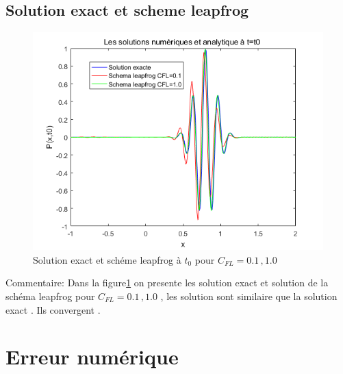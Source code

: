 \documentclass[a4paper,10pt]{report} %
\begin{document}
\section{Solution exact et scheme leapfrog }
\begin{figure}[h]
\begin{center}
\includegraphics[width=1.0\textwidth]{FIG/figure4.png}
\end{center}
\caption{Solution exact et schéme leapfrog à $t_0$ pour $C_{FL}=0.1\,,1.0$}
\label{figure4}
\end{figure}
Commentaire:
Dans la figure\ref{figure4} on presente les solution exact et solution de la schéma leapfrog  pour 
$C_{FL}=0.1\,,1.0$ , les solution sont similaire que la solution exact . Ils convergent .
\chapter{Erreur numérique}
\end{document}
